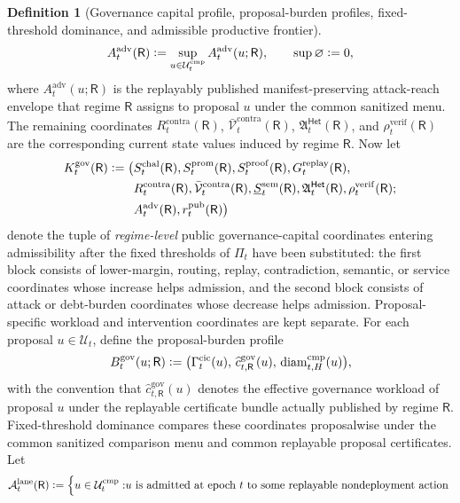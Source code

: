 \documentclass[11pt]{article}
\theoremstyle{definition}
\newtheorem{definition}[theorem]{Definition}
\newcommand{\1}{\mathbf{1}}
\newcommand{\Defeq}{\vcentcolon=}
\newcommand{\Het}{\mathsf{Het}}
\begin{document}
\begin{definition}[Governance capital profile, proposal-burden profiles, fixed-threshold dominance, and admissible productive frontier]
\[
A_t^{\mathrm{adv}}(\mathsf R)\Defeq \sup_{u\in\mathcal U_t^{\mathrm{cmp}}} A_t^{\mathrm{adv}}(u;\mathsf R),
\qquad
\sup\varnothing\Defeq 0,
\]
where $A_t^{\mathrm{adv}}(u;\mathsf R)$ is the replayably published manifest-preserving attack-reach envelope that regime $\mathsf R$ assigns to proposal $u$ under the common sanitized menu. The remaining coordinates $R_t^{\mathrm{contra}}(\mathsf R)$, $\bar{\mathcal V}_t^{\mathrm{contra}}(\mathsf R)$, $\mathfrak A_t^{\Het}(\mathsf R)$, and $\rho_t^{\mathrm{verif}}(\mathsf R)$ are the corresponding current state values induced by regime $\mathsf R$. Now let
\[
\begin{aligned}
K_t^{\mathrm{gov}}(\mathsf R)\Defeq\bigl(
&S_t^{\mathrm{chal}}(\mathsf R),
S_t^{\mathrm{prom}}(\mathsf R),
S_t^{\mathrm{proof}}(\mathsf R),
G_t^{\mathrm{replay}}(\mathsf R),\\
&R_t^{\mathrm{contra}}(\mathsf R),
\bar{\mathcal V}_t^{\mathrm{contra}}(\mathsf R),
\underline S_t^{\mathrm{sem}}(\mathsf R),
\mathfrak A_t^{\Het}(\mathsf R),
\rho_t^{\mathrm{verif}}(\mathsf R);\\
&A_t^{\mathrm{adv}}(\mathsf R),
 r_t^{\mathrm{pub}}(\mathsf R)
\bigr)
\end{aligned}
\]
denote the tuple of \emph{regime-level} public governance-capital coordinates entering admissibility after the fixed thresholds of $\Pi_t$ have been substituted: the first block consists of lower-margin, routing, replay, contradiction, semantic, or service coordinates whose increase helps admission, and the second block consists of attack or debt-burden coordinates whose decrease helps admission. Proposal-specific workload and intervention coordinates are kept separate. For each proposal $u\in\mathcal U_t$, define the proposal-burden profile
\[
B_t^{\mathrm{gov}}(u;\mathsf R)\Defeq \bigl(\Gamma_t^{\mathrm{cic}}(u),\,\widehat c_{t,\mathsf R}^{\mathrm{gov}}(u),\,\operatorname{diam}^{\mathrm{cmp}}_{t,H}(u)\bigr),
\]
with the convention that $\widehat c_{t,\mathsf R}^{\mathrm{gov}}(u)$ denotes the effective governance workload of proposal $u$ under the replayable certificate bundle actually published by regime $\mathsf R$. Fixed-threshold dominance compares these coordinates proposalwise under the common sanitized comparison menu and common replayable proposal certificates. Let
\[
\begin{aligned}
\mathcal A_t^{\mathrm{lane}}(\mathsf R)\Defeq
\Bigl\{u\in\mathcal U_t^{\mathrm{cmp}}:
&\text{$u$ is admitted at epoch $t$ to some replayable nondeployment action }\\

\end{aligned}\]
\end{definition}
\end{document}
